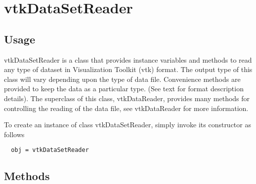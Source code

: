 \section{vtkDataSetReader}

\subsection{Usage}

 vtkDataSetReader is a class that provides instance variables and methods
 to read any type of dataset in Visualization Toolkit (vtk) format.  The
 output type of this class will vary depending upon the type of data
 file. Convenience methods are provided to keep the data as a particular
 type. (See text for format description details).
 The superclass of this class, vtkDataReader, provides many methods for
 controlling the reading of the data file, see vtkDataReader for more
 information.

To create an instance of class vtkDataSetReader, simply
invoke its constructor as follows
\begin{verbatim}
  obj = vtkDataSetReader
\end{verbatim}
\subsection{Methods}

